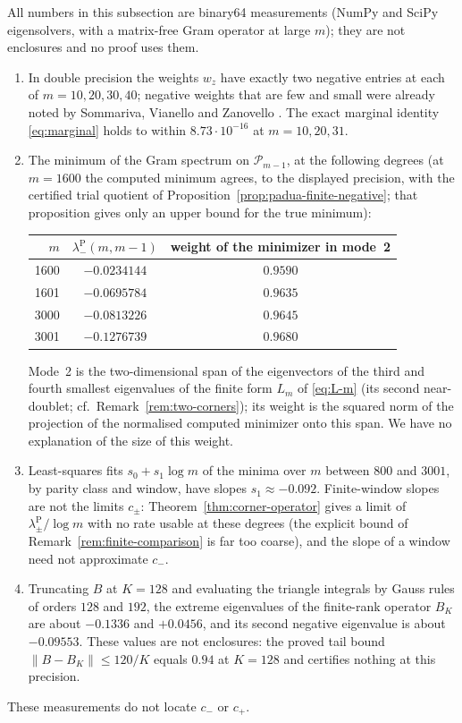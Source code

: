 \documentclass[preprint,12pt,a4paper]{elsarticle}
\theoremstyle{remark}
\newcommand{\Pa}{\mathrm P}
\begin{document}
All numbers in this subsection are binary64 measurements (NumPy and SciPy
eigensolvers, with a matrix-free Gram operator at large $m$); they are
not enclosures and no proof uses them.
\begin{enumerate}
\item[(1)] In double precision the weights $w_z$ have exactly two negative entries at each of
 $m=10,20,30,40$; negative weights that are few and small were already noted by
 Sommariva, Vianello and Zanovello \cite{SVZ08}. The exact marginal identity
 \eqref{eq:marginal} holds to within $8.73\cdot10^{-16}$ at $m=10,20,31$.
\item[(2)] The minimum of the Gram spectrum on $\mathcal P_{m-1}$, at the
 following degrees (at $m=1600$ the computed minimum agrees, to the displayed
 precision, with the certified trial quotient of
 Proposition~\ref{prop:padua-finite-negative}; that proposition gives only an
 upper bound for the true minimum):
\begin{center}
\begin{tabular}{rcc}\toprule
$m$ & $\lambda^\Pa_-(m,m-1)$ & weight of the minimizer in mode~2\\\midrule
1600 & $-0.0234144$ & $0.9590$\\
1601 & $-0.0695784$ & $0.9635$\\
3000 & $-0.0813226$ & $0.9645$\\
3001 & $-0.1276739$ & $0.9680$\\\bottomrule
\end{tabular}
\end{center}
 Mode~2 is the two-dimensional span of the eigenvectors of the third and
 fourth smallest eigenvalues of the finite form $L_m$ of \eqref{eq:L-m} (its
 second near-doublet; cf.\ Remark~\ref{rem:two-corners}); its weight is the
 squared norm of the projection of the normalised computed minimizer onto this
 span. We have no explanation of the size of this weight.
\item[(3)] Least-squares fits $s_0+s_1\log m$ of the minima over $m$ between
 $800$ and $3001$, by parity class and window, have slopes $s_1\approx-0.092$.
 Finite-window slopes are not the limits $c_\pm$: Theorem~\ref{thm:corner-operator}
 gives a limit of $\lambda^\Pa_\pm/\log m$ with no rate usable at these degrees
 (the explicit bound of Remark~\ref{rem:finite-comparison} is far too coarse),
 and the slope of a window need not approximate $c_-$.
\item[(4)] Truncating $B$ at $K=128$ and evaluating the triangle integrals by Gauss
 rules of orders $128$ and $192$, the extreme eigenvalues of the finite-rank
 operator $B_K$ are about $-0.1336$ and $+0.0456$, and its second negative
 eigenvalue is about $-0.09553$. These values are not enclosures: the proved
 tail bound $\|B-B_K\|\le120/K$ equals $0.94$ at $K=128$ and certifies nothing
 at this precision.
\end{enumerate}
These measurements do not locate $c_-$ or $c_+$.
\end{document}
